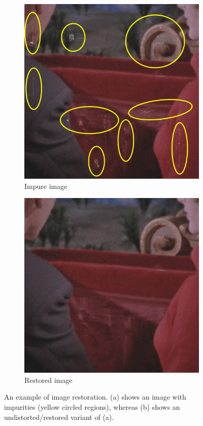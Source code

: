 \begin{figure}[H]
	\centering
	\begin{subfigure}{.3\textwidth}
		\centering
		\includegraphics[width=\linewidth]{introduction/input.png}
		\caption[figure]{Impure image}
		\label{fig:intro_input}
	\end{subfigure}
	\begin{subfigure}{.3\textwidth}
		\centering
		\includegraphics[width=\linewidth]{introduction/output.png}
		\caption[figure]{Restored image}
		\label{fig:intro_restored}
	\end{subfigure}
	\caption[figure]{An example of image restoration. (a) shows an image with impurities (yellow circled regions), whereas (b) shows an undistorted/restored variant of (a).}
	\label{fig:intro_desc}
\end{figure}

